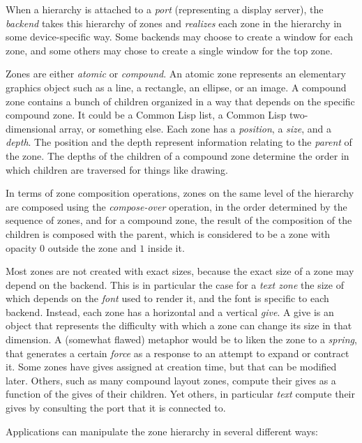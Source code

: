 \documentclass{report}
\def\cl{Common Lisp}
\begin{document}
When a hierarchy is attached to a \emph{port} (representing a display
server), the \emph{backend} takes this hierarchy of zones and
\emph{realizes} each zone in the hierarchy in some device-specific
way.  Some backends may choose to create a window for each zone, and
some others may chose to create a single window for the top zone. 

Zones are either \emph{atomic} or \emph{compound}.  An atomic
zone represents an elementary graphics object such as a line, a
rectangle, an ellipse, or an image.  A compound zone contains
a bunch of children organized in a way that depends on the specific
compound zone.  It could be a \cl{} list, a \cl{} two-dimensional
array, or something else.  Each zone has a \emph{position}, a
\emph{size}, and a \emph{depth}.  The position and the depth represent
information relating to the \emph{parent} of the zone.  The depths 
of the children of a compound zone determine the order in which
children are traversed for things like drawing. 

In terms of zone composition operations, zones on the same level
of the hierarchy are composed using the \emph{compose-over} operation,
in the order determined by the sequence of zones, and for a compound
zone, the result of the composition of the children is composed with
the parent, which is considered to be a zone with opacity $0$
outside the zone and $1$ inside it.

Most zones are not created with exact sizes, because the exact size of
a zone may depend on the backend.  This is in particular the case for
a \emph{text zone} the size of which depends on the \emph{font} used
to render it, and the font is specific to each backend.  Instead, each
zone has a horizontal and a vertical \emph{give}.  A give is an object
that represents the difficulty with which a zone can change its size
in that dimension.  A (somewhat flawed) metaphor would be to liken the
zone to a \emph{spring}, that generates a certain \emph{force} as a
response to an attempt to expand or contract it.  Some zones have
gives assigned at creation time, but that can be modified later.
Others, such as many compound layout zones, compute their gives as a
function of the gives of their children.  Yet others, in particular
\emph{text} compute their gives by consulting the port that it is
connected to.  

Applications can manipulate the zone hierarchy in several different
ways:  
\end{document}
